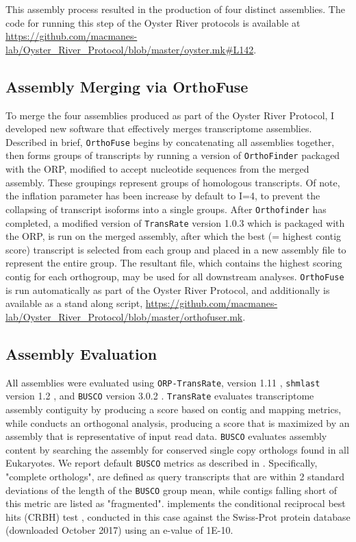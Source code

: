 \documentclass[10pt,letterpaper]{article}
\begin{document}
This assembly process resulted in the production of four distinct assemblies. The code for running this step of the Oyster River protocols is available at \url{https://github.com/macmanes-lab/Oyster_River_Protocol/blob/master/oyster.mk#L142}.  
 

\subsection{Assembly Merging via OrthoFuse}

To merge the four assemblies produced as part of the Oyster River Protocol, I developed new software that effectively merges transcriptome assemblies. Described in brief, \texttt{OrthoFuse} begins by concatenating all assemblies together, then forms groups of transcripts by running a version of \texttt{OrthoFinder} \cite{Emms:2015iga} packaged with the ORP, modified to accept nucleotide sequences from the merged assembly. These groupings represent groups of homologous transcripts. Of note, the inflation parameter has been increase by default to I=4, to prevent the collapsing of transcript isoforms into a single groups. After \texttt{Orthofinder} has completed, a modified version of \texttt{TransRate} version 1.0.3 \cite{SmithUnna:2016go} which is packaged with the ORP, is run on the merged assembly, after which the best (= highest contig score) transcript is selected from each group and placed in a new assembly file to represent the entire group. The resultant file, which contains the highest scoring contig for each orthogroup, may be used for all downstream analyses. \texttt{OrthoFuse} is run automatically as part of the Oyster River Protocol, and additionally is available as a stand along script, \url{https://github.com/macmanes-lab/Oyster_River_Protocol/blob/master/orthofuser.mk}.

\subsection{Assembly Evaluation}

All assemblies were evaluated using \texttt{ORP-TransRate},  version 1.11 \cite{Li:2014cma}, \texttt{shmlast} version 1.2 \cite{Scott:2017eg}, and \texttt{BUSCO} version 3.0.2 \cite{Simao:2015kk}. \texttt{TransRate} evaluates transcriptome assembly contiguity by producing a score based on contig and mapping metrics, while  conducts an orthogonal analysis, producing a score that is maximized by an assembly that is representative of input read data. \texttt{BUSCO} evaluates assembly content by searching the assembly for conserved single copy orthologs found in all Eukaryotes. We report default \texttt{BUSCO} metrics as described in \cite{Simao:2015kk}. Specifically, "complete orthologs", are defined as query transcripts that are within 2 standard deviations of the length of the \texttt{BUSCO} group mean, while contigs falling short of this metric are listed as "fragmented".  implements the conditional reciprocal best hits (CRBH) test \cite{Aubry:2014en}, conducted in this case against the Swiss-Prot protein database (downloaded October 2017) using an e-value of 1E-10.   \\
\end{document}
